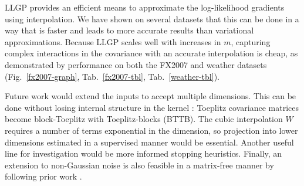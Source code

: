 \documentclass{article}
\begin{document}
LLGP provides an efficient means to approximate the log-likelihood gradients using interpolation. We have shown on several datasets that this can be done in a way that is faster and leads to more accurate results than variational approximations. Because LLGP scales well with increases in $m$, capturing complex interactions in the covariance with an accurate interpolation is cheap, as demonstrated by performance on both the FX2007 and weather datasets (Fig.~\ref{fx2007-graph}, Tab.~\ref{fx2007-tbl}, Tab.~\ref{weather-tbl}).

Future work would extend the inputs to accept multiple dimensions. This can be done without losing internal structure in the kernel \cite{msgp}: Toeplitz covariance matrices become block-Toeplitz with Toeplitz-blocks (BTTB). The cubic interpolation $W$ requires a number of terms exponential in the dimension, so projection into lower dimensions estimated in a supervised manner would be essential.
Another useful line for investigation would be more informed stopping heuristics. %
Finally, an extension to non-Gaussian noise is also feasible in a matrix-free manner by following prior work \cite{cutajar2016preconditioning}.



\end{document}
